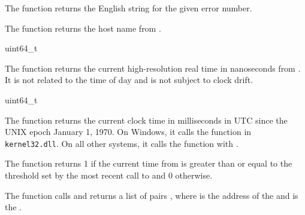 \begin{function}
\end{function}

The  function returns the English string
for the given error number.

\begin{function}
\end{function}

The  function returns the host name from
.

\begin{function}
  uint64\_t 
\end{function}

The  function returns the current
high-resolution real time in nanoseconds from . It is
not related to the time of day and is not subject to clock drift.

\begin{function}
  uint64\_t 
\end{function}

The  function returns the current clock time in
milliseconds in UTC since the UNIX epoch January 1, 1970. On Windows,
it calls the  function in
\texttt{kernel32.dll}. On all other systems, it calls the
 function with .

\begin{function}
\end{function}

The  function returns 1 if the current time
from  is greater than or equal to the threshold set
by the most recent call to  and 0 otherwise.

\begin{function}
\end{function}

The  function calls  and
returns a list of pairs , where
 is the address of the  and 
is the .

